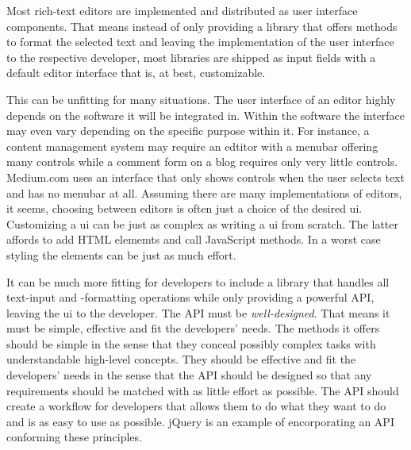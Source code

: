 Most rich-text editors are implemented and distributed as user interface components. That means instead of only providing a library that offers methods to format the selected text and leaving the implementation of the user interface to the respective developer, most libraries are shipped as input fields with a default editor interface that is, at best, customizable.

This can be unfitting for many situations. The user interface of an editor highly depends on the software it will be integrated in. Within the software the interface may even vary depending on the specific purpose within it. For instance, a content management system may require an edtitor with a menubar offering many controls while a comment form on a blog requires only very little controls. Medium.com uses an interface that only shows controls when the user selects text and has no menubar at all. Assuming there are many implementations of editors, it seems, choosing between editors is often just a choice of the desired ui. Customizing a ui can be just as complex as writing a ui from scratch. The latter affords to add HTML elememts and call JavaScript methods. In a worst case styling the elements can be just as much effort.

It can be much more fitting for developers to include a library that handles all text-input and -formatting operations while only providing a powerful API, leaving the ui to the developer. The API must be \textit{well-designed}. That means it must be simple, effective and fit the developers' needs. The methods it offers should be simple in the sense that they conceal possibly complex tasks with understandable high-level concepts. They should be effective and fit the developers' needs in the sense that the API should be designed so that any requirements should be matched with as little effort as possible. The API should create a workflow for developers that allows them to do what they want to do and is as easy to use as possible. jQuery is an example of encorporating an API conforming these principles.


